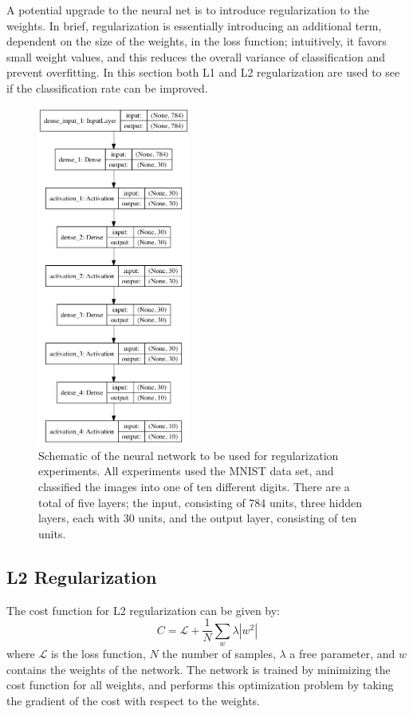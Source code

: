 \documentclass{article}
\begin{document}
A potential upgrade to the neural net is to introduce regularization to the weights. In brief, regularization is essentially introducing an additional term, dependent on the size of the weights, in the loss function; intuitively, it favors small weight values, and this reduces the overall variance of classification and prevent overfitting. In this section both L1 and L2 regularization are used to see if the classification rate can be improved. 


\begin{figure}[H]
    \centering
    \includegraphics[width=5cm]{model}
    \caption{Schematic of the neural network to be used for regularization experiments. All experiments used the MNIST data set, and classified the images into one of ten different digits. There are a total of five layers; the input, consisting of 784 units, three hidden layers, each with 30 units, and the output layer, consisting of ten units.}
    \label{fig:net1}
\end{figure}

\subsection{L2 Regularization}
The cost function for L2 regularization can be given by:
\[
    C = \mathcal{L} + \frac{1}{N} \sum_w \lambda |w^2|
\] 
where $\mathcal{L}$ is the loss function, $N$ the number of samples, $\lambda$ a free parameter, and $w$ contains the weights of the network. The network is trained by minimizing the cost function for all weights, and performs this optimization problem by taking the gradient of the cost with respect to the weights. \\
\end{document}
